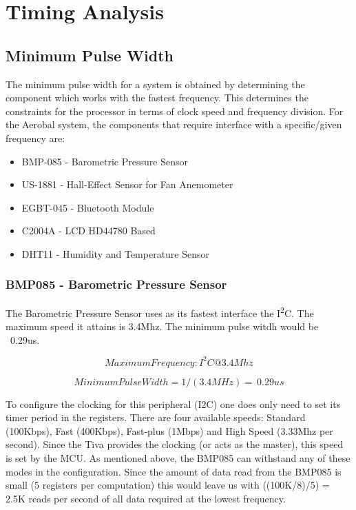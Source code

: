 \section{Timing Analysis}
	
	\subsection{Minimum Pulse Width}

		The minimum pulse width for a system is obtained by determining the component which works with the fastest frequency. This determines the constraints for the processor in terms of clock speed and frequency division. For the Aerobal system, the components that require interface with a specific/given frequency are:

		\begin{itemize}
			\item BMP-085 - Barometric Pressure Sensor
			\item US-1881 - Hall-Effect Sensor for Fan Anemometer
			\item EGBT-045 - Bluetooth Module
			\item C2004A - LCD HD44780 Based
			\item DHT11 - Humidity and Temperature Sensor
		\end{itemize}


		\subsubsection{BMP085 - Barometric Pressure Sensor}
			The Barometric Pressure Sensor uses as its fastest interface the I\textsuperscript{2}C. The maximum speed it attains is 3.4Mhz. The minimum pulse witdh would be ~0.29us.

			$$Maximum Frequency: I^2C @ 3.4Mhz$$

			$$Minimum Pulse Width = 1/(3.4MHz) = ~0.29us$$


			To configure the clocking for this peripheral (I2C) one does only need to set its timer period in the registers. There are four available speeds: Standard (100Kbps), Fast (400Kbps), Fast-plus (1Mbps) and High Speed (3.33Mhz per second). Since the Tiva provides the clocking (or acts as the master), this speed is set by the MCU. As mentioned above, the BMP085 can withstand any of these modes in the configuration. Since the amount of data read from the BMP085 is small (5 registers per computation) this would leave us with ((100K/8)/5) = 2.5K reads per second of all data required at the lowest frequency.


